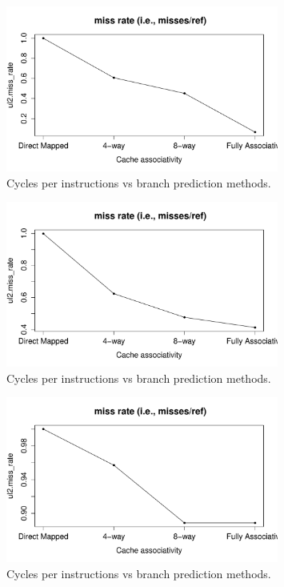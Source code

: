 \documentclass[10pt]{scrartcl}
\begin{document}
\begin{figure}[h]
  \centering
  \includegraphics[width=0.8\textwidth]{NewPlots/plot_A_miss_rate}
  \caption{Cycles per instructions vs branch prediction methods.}\label{fig:cache-A_miss_rate}
\end{figure}
\begin{figure}[h]
  \centering
  \includegraphics[width=0.8\textwidth]{NewPlots/plot_A_A_miss_rate}
  \caption{Cycles per instructions vs branch prediction methods.}\label{fig:cache-A_A_miss_rate}
\end{figure}
\begin{figure}[h]
  \centering
  \includegraphics[width=0.8\textwidth]{NewPlots/plot_A_C_miss_rate}
  \caption{Cycles per instructions vs branch prediction methods.}\label{fig:cache-A_C_miss_rate}
\end{figure}
\end{document}
